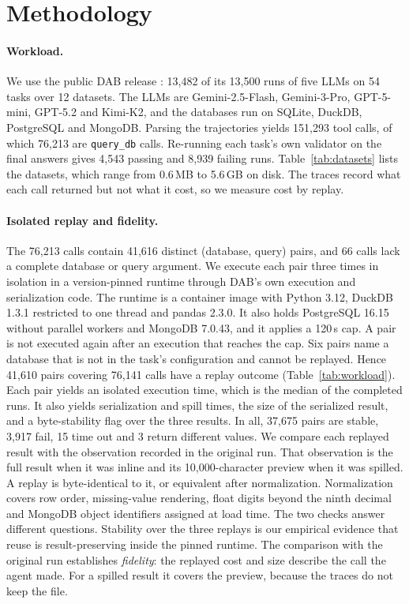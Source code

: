 \section{Methodology}
\label{sec:method}



\paragraph{Workload.}
We use the public DAB release \cite{ma2026dab}: 13,482 of its 13,500 runs of five LLMs on 54 tasks over 12 datasets.
The LLMs are Gemini-2.5-Flash, Gemini-3-Pro, GPT-5-mini, GPT-5.2 and Kimi-K2, and the databases run on SQLite,
DuckDB, PostgreSQL and MongoDB. Parsing the trajectories yields 151,293 tool calls, of which 76,213 are
\texttt{query\_db} calls. Re-running each task's own validator on the final answers gives 4,543 passing and 8,939
failing runs. Table~\ref{tab:datasets} lists the datasets, which range from 0.6\,MB to 5.6\,GB on disk. The traces
record what each call returned but not what it cost, so we measure cost by replay.




\paragraph{Isolated replay and fidelity.}
The 76,213 calls contain 41,616 distinct (database, query) pairs, and 66 calls lack a complete database or query
argument. We execute each pair three times in isolation in a version-pinned runtime through DAB's own execution and
serialization code. The runtime is a container image with Python 3.12, DuckDB 1.3.1 restricted to one thread and
pandas 2.3.0. It also holds PostgreSQL 16.15 without parallel workers and MongoDB 7.0.43, and it applies a 120\,s cap.
A pair is not executed again after an execution that reaches the cap. Six pairs name a database that is not in the
task's configuration and cannot be replayed. Hence 41,610 pairs covering 76,141 calls have a replay outcome
(Table~\ref{tab:workload}). Each pair yields an isolated execution time, which is the median of the completed runs.
It also yields serialization and spill times, the size of the serialized result, and a byte-stability flag over the
three results. In all, 37,675 pairs are stable, 3,917 fail, 15 time out and 3 return different values. We compare
each replayed result with the observation recorded in the original run. That observation is the full result when it
was inline and its 10,000-character preview when it was spilled. A replay is byte-identical to it, or equivalent
after normalization. Normalization covers row order, missing-value rendering, float digits beyond the ninth decimal
and MongoDB object identifiers assigned at load time. The two checks answer different questions. Stability over the
three replays is our empirical evidence that reuse is result-preserving inside the pinned runtime. The comparison
with the original run establishes \emph{fidelity}: the replayed cost and size describe the call the agent made. For a
spilled result it covers the preview, because the traces do not keep the file.

